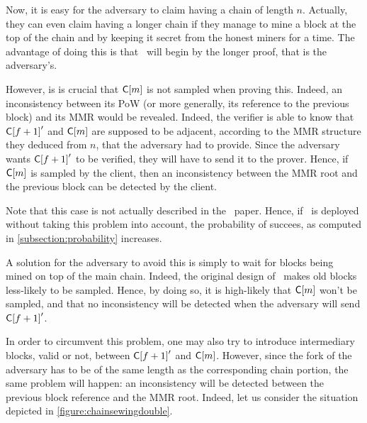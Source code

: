       Now, it is easy for the adversary to claim having a chain of length \(n\). Actually, they can even claim having a longer chain if they manage to mine a block at the top of the chain and by keeping it secret from the honest miners for a time. The advantage of doing this is that \FC\ will begin by the longer proof, that is the adversary's.
      
      However, is is crucial that \(\mathsf{C[}m\mathsf{]}\) is not sampled when proving this. Indeed, an inconsistency between its PoW (or more generally, its reference to the previous block) and its MMR would be revealed. Indeed, the verifier is able to know that \(\mathsf{C[}f+1\mathsf{]}'\) and \(\mathsf{C[}m\mathsf{]}\) are supposed to be adjacent, according to the MMR structure they deduced from \(n\), that the adversary had to provide. Since the adversary wants \(\mathsf{C[}f+1\mathsf{]}'\) to be verified, they will have to send it to the prover. Hence, if \(\mathsf{C[}m\mathsf{]}\) is sampled by the client, then an inconsistency between the MMR root and the previous block can be detected by the client.
      
      Note that this case is not actually described in the \FC\ paper. Hence, if \FC\ is deployed without taking this problem into account, the probability of succees, as computed in \autoref{subsection:probability} increases. 
      
      A solution for the adversary to avoid this is simply to wait for blocks being mined on top of the main chain. Indeed, the original design of \FC\ makes old blocks less-likely to be sampled. Hence, by doing so, it is high-likely that \(\mathsf{C[}m\mathsf{]}\) won't be sampled, and that no inconsistency will be detected when the adversary will send \(\mathsf{C[}f+1\mathsf{]}'\).
      
      In order to circumvent this problem, one may also try to introduce intermediary blocks, valid or not, between \(\mathsf{C[}f+1\mathsf{]}'\) and \(\mathsf{C[}m\mathsf{]}\). However, since the fork of the adversary has to be of the same length as the corresponding chain portion, the same problem will happen: an inconsistency will be detected between the previous block reference and the MMR root. Indeed, let us consider the situation depicted in \autoref{figure:chainsewingdouble}.
      
